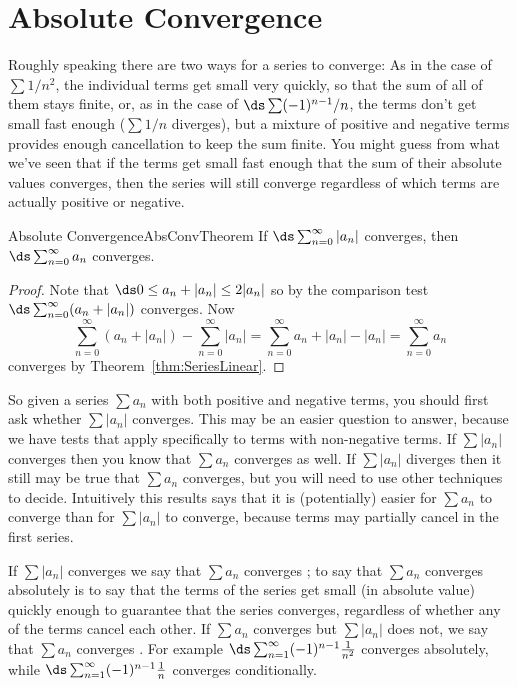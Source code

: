 \section{Absolute Convergence}\label{sec:AbsoluteConvergence}

Roughly speaking there are two ways for a series to converge: As in
the case of $\sum 1/n^2$, the individual terms get small very quickly,
so that the sum of all of them stays finite, or, as in the case of
$\ds \sum (-1)^{n-1}/n$, the terms don't get small fast enough ($\sum 1/n$
diverges), but a mixture of positive and negative terms provides
enough cancellation to keep the sum finite. You might guess from what
we've seen that if the terms get small fast enough that the sum of their
absolute values converges, then the series will still converge regardless
of which terms are actually positive or negative. 

\begin{theorem}{Absolute Convergence}{AbsConvTheorem}
If $\ds\sum_{n=0}^\infty |a_n|$ converges, then 
$\ds\sum_{n=0}^\infty a_n$ converges.
\end{theorem}
\begin{proof}
Note that $\ds 0\le a_n+|a_n|\le 2|a_n|$ so by the comparison test
$\ds\sum_{n=0}^\infty (a_n+|a_n|)$ converges. Now
$$
  \sum_{n=0}^\infty (a_n+|a_n|) -\sum_{n=0}^\infty |a_n|
  = \sum_{n=0}^\infty a_n+|a_n|-|a_n| = \sum_{n=0}^\infty a_n 
$$
converges by Theorem~\ref{thm:SeriesLinear}.
\end{proof}

So given a series $\sum a_n$ with both positive and negative terms,
you should first ask whether $\sum |a_n|$ converges. This may be an
easier question to answer, because we have tests that apply
specifically to terms with non-negative terms. If $\sum |a_n|$
converges then you know that $\sum a_n$ converges as well. If $\sum
|a_n|$ diverges then it still may be true that $\sum a_n$
converges, but you will need to use other techniques to decide.
Intuitively this results says that it is (potentially) easier for
$\sum a_n$ to converge than for $\sum |a_n|$ to converge, because terms
may partially cancel in the first series. 

If $\sum |a_n|$ converges we say that $\sum a_n$ converges ;
to say that $\sum a_n$ converges absolutely is to say that the terms of the series
get small (in absolute value) quickly enough to guarantee that the series converges,
regardless of whether any of the terms cancel each other. If $\sum a_n$
converges but $\sum |a_n|$ does not, we say that $\sum a_n$ converges
. For
example $\ds\sum_{n=1}^\infty (-1)^{n-1} {1\over n^2}$ converges
absolutely, while $\ds\sum_{n=1}^\infty (-1)^{n-1} {1\over n}$
converges conditionally.


